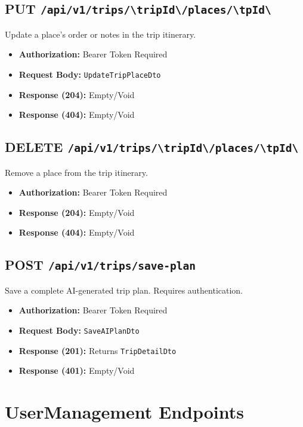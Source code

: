 \subsection{PUT \texttt{/api/v1/trips/\textbackslash{}{tripId\textbackslash{}}/places/\textbackslash{}{tpId\textbackslash{}}}}
Update a place's order or notes in the trip itinerary.
\begin{itemize}
    \item \textbf{Authorization:} Bearer Token Required
    \item \textbf{Request Body:} \texttt{UpdateTripPlaceDto}
    \item \textbf{Response (204):} Empty/Void
    \item \textbf{Response (404):} Empty/Void
\end{itemize}

\subsection{DELETE \texttt{/api/v1/trips/\textbackslash{}{tripId\textbackslash{}}/places/\textbackslash{}{tpId\textbackslash{}}}}
Remove a place from the trip itinerary.
\begin{itemize}
    \item \textbf{Authorization:} Bearer Token Required
    \item \textbf{Response (204):} Empty/Void
    \item \textbf{Response (404):} Empty/Void
\end{itemize}

\subsection{POST \texttt{/api/v1/trips/save-plan}}
Save a complete AI-generated trip plan. Requires authentication.
\begin{itemize}
    \item \textbf{Authorization:} Bearer Token Required
    \item \textbf{Request Body:} \texttt{SaveAIPlanDto}
    \item \textbf{Response (201):} Returns \texttt{TripDetailDto}
    \item \textbf{Response (401):} Empty/Void
\end{itemize}

\section{UserManagement Endpoints}

